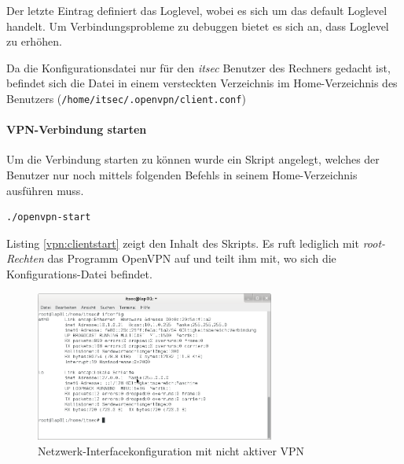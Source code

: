 Der letzte Eintrag definiert das Loglevel, wobei es sich um das default Loglevel handelt. Um Verbindungsprobleme zu debuggen bietet es sich an, dass Loglevel zu erhöhen.

Da die Konfigurationsdatei nur für den \emph{itsec} Benutzer des Rechners gedacht ist, befindet sich die Datei in einem versteckten Verzeichnis im Home-Verzeichnis des Benutzers (\texttt{/home/itsec/.openvpn/client.conf})

\paragraph{VPN-Verbindung starten}

Um die Verbindung starten zu können wurde ein Skript angelegt, welches der Benutzer nur noch mittels folgenden Befehls in seinem Home-Verzeichnis ausführen muss.

\begin{lstlisting}
./openvpn-start
\end{lstlisting}



Listing \ref{vpn:clientstart} zeigt den Inhalt des Skripts. Es ruft lediglich mit \emph{root-Rechten} das Programm OpenVPN auf und teilt ihm mit, wo sich die Konfigurations-Datei befindet.

\begin{figure}[h!]
  \centering
    \includegraphics[width=0.7\textwidth]{figures/vpn_ifconfig_lap01.png}
  \caption{Netzwerk-Interfacekonfiguration mit nicht aktiver VPN}
  \label{vpn:screenshot_ifconfig1}
\end{figure}

